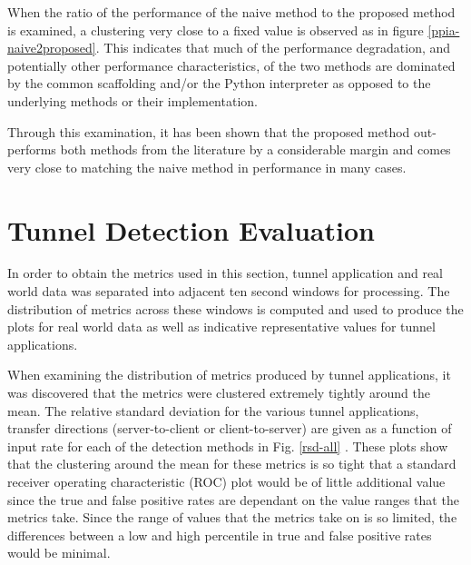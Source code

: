 \documentclass{llncs}
\begin{document}
When the ratio of the performance of the naive method to the proposed method is
examined, a clustering very close to a fixed value is observed as in figure
\ref{ppia-naive2proposed}. This indicates that much of the performance
degradation, and potentially other performance characteristics, of the two
methods are dominated by the common scaffolding and/or the Python interpreter as
opposed to the underlying methods or their implementation.

Through this examination, it has been shown that the proposed method
out-performs both methods from the literature by a considerable margin and comes
very close to matching the naive method in performance in many cases.

\section{Tunnel Detection Evaluation}
\label{chap-evaluation}
\label{tunnel-detection-performance}

In order to obtain the metrics used in this section, tunnel application and real
world data was separated into adjacent ten second windows for processing. The
distribution of metrics across these windows is computed and used to produce the
plots for real world data as well as indicative representative values for tunnel
applications.

When examining the distribution of metrics produced by tunnel applications, it
was discovered that the metrics were clustered extremely tightly around the
mean. The relative standard deviation for the various tunnel applications,
transfer directions (server-to-client or client-to-server) are given as a
function of input rate for each of the detection methods in
Fig. \ref{rsd-all}
. These
plots show that the clustering around the mean for these metrics is so tight
that a standard receiver operating characteristic (ROC) plot would be of little
additional value since the true and false positive rates are dependant on the
value ranges that the metrics take. Since the range of values that the metrics
take on is so limited, the differences between a low and high percentile in true
and false positive rates would be minimal.
\end{document}
